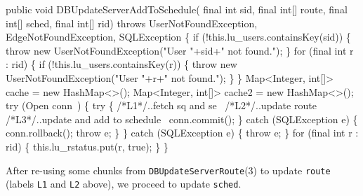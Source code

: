 \documentclass{article}
\def\nwendcode{\endtrivlist \endgroup}      %
\let\nwdocspar=\par
\theoremstyle{definition}                   %
\begin{document}
public void DBUpdateServerAddToSchedule(
    final int sid, final int[] route, final int[] sched, final int[] rid)
throws UserNotFoundException, EdgeNotFoundException, SQLException \{
  if (!this.lu_users.containsKey(sid)) \{
    throw new UserNotFoundException("User "+sid+" not found.");
  \}
  for (final int r : rid) \{
    if (!this.lu_users.containsKey(r)) \{
      throw new UserNotFoundException("User "+r+" not found.");
    \}
  \}
  Map<Integer, int[]> cache  = new HashMap<>();
  Map<Integer, int[]> cache2 = new HashMap<>();
  try (\LA{}Open \code{}conn\edoc{}~{\nwtagstyle{}}\RA{}) \{
    try \{
/*L1*/\LA{}..fetch \code{}sq\edoc{} and \code{}se\edoc{}~{\nwtagstyle{}}\RA{}
/*L2*/\LA{}..update route~{\nwtagstyle{}}\RA{}
/*L3*/\LA{}..update and add to schedule~{\nwtagstyle{}}\RA{}
      conn.commit();
    \} catch (SQLException e) \{
      conn.rollback();
      throw e;
    \}
  \} catch (SQLException e) \{
    throw e;
  \}
\eatline
{}\nwendcode{}
\nwenddocs{}\plusendmoddef
  for (final int r : rid) \{
    this.lu_rstatus.put(r, true);
  \}
\}
\nwendcode{}\nwdocspar
{\small After re-using some chunks from {\tt{}\protect{}DBUpdateServerRoute}(3) to update
{\tt{}route} (labels {\tt{}L1} and {\tt{}L2} above), we proceed to update {\tt{}sched}.}
\nwenddocs{}\endmoddef{}
\end{document}
